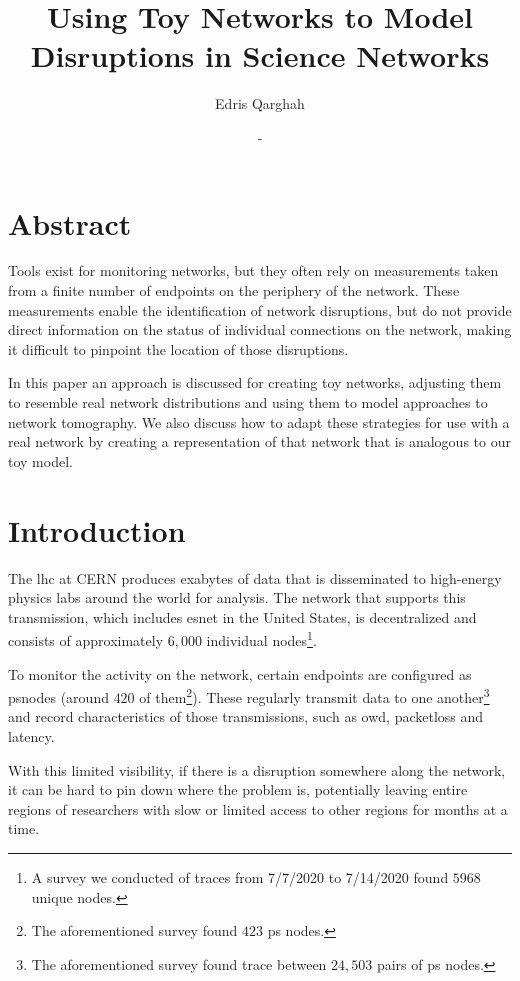 \documentclass{finalreport}
\title{Using Toy Networks to Model Disruptions in Science Networks}
\author{Edris Qarghah}
\date{\DTMusedate{startdate}-\DTMusedate{enddate}}
\begin{document}
\maketitle

\newpage

\section{Abstract}

Tools exist for monitoring networks, but they often rely on measurements taken from a finite number of endpoints on the periphery of the network. These measurements enable the identification of network disruptions, but do not provide direct information on the status of individual connections on the network, making it difficult to pinpoint the location of those disruptions.

In this paper an approach is discussed for creating toy networks, adjusting them to resemble real network distributions and using them to model approaches to network tomography. We also discuss how to adapt these strategies for use with a real network by creating a representation of that network that is analogous to our toy model.

\section*{Introduction}

The \gls{lhc} at CERN\cite{cern} produces exabytes of data that is disseminated to high-energy physics labs around the world for analysis. The network that supports this transmission, which includes \gls{esnet}\cite{esnet} in the United States, is decentralized and consists of approximately $6,000$ individual \glspl{node}\footnote{A survey we conducted of \glspl{trace} from 7/7/2020 to 7/14/2020 found $5968$ unique \glspl{node}.}.

To monitor the activity on the network, certain \glspl{endpoint} are configured as \glspl{psnode}\cite{perfsonar} (around $420$ of them\footnote{The aforementioned survey found $423$ \gls{ps} nodes.}). These regularly transmit data to one another\footnote{The aforementioned survey found \gls{trace} between $24,503$ pairs of \gls{ps} nodes.} and record characteristics of those transmissions, such as \gls{owd}, \gls{packetloss} and \gls{latency}. 

With this limited visibility, if there is a disruption somewhere along the network, it can be hard to pin down where the problem is, potentially leaving entire regions of researchers with slow or limited access to other regions for months at a time.
\end{document}
